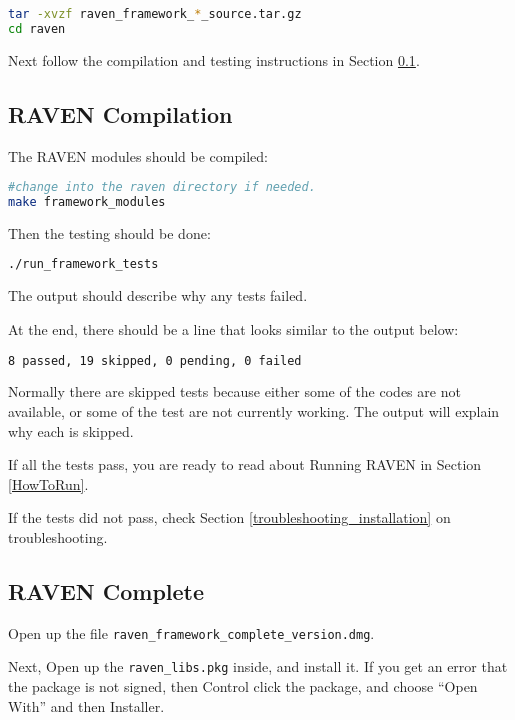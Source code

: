 \begin{lstlisting}[language=bash]
tar -xvzf raven_framework_*_source.tar.gz
cd raven
\end{lstlisting}

Next follow the compilation and testing instructions in Section
\ref{raven_compilation}.

\subsection{RAVEN Compilation}
\label{raven_compilation}

The RAVEN modules should be compiled:

\begin{lstlisting}[language=bash]
#change into the raven directory if needed.
make framework_modules
\end{lstlisting}

Then the testing should be done:

\begin{lstlisting}[language=bash]
./run_framework_tests
\end{lstlisting}

The output should describe why any tests failed.

At the end, there should be a line that looks similar to the output below:
\begin{lstlisting}[language=bash]
8 passed, 19 skipped, 0 pending, 0 failed
\end{lstlisting}

Normally there are skipped tests because either some of the codes are
not available, or some of the test are not currently working.  The
output will explain why each is skipped.

If all the tests pass, you are ready to read about Running RAVEN in
Section \ref{HowToRun}.

If the tests did not pass, check Section
\ref{troubleshooting_installation} on troubleshooting.

\subsection{RAVEN Complete}
\label{raven_complete}

Open up the file \texttt{raven\_framework\_complete\_version.dmg}.

Next, Open up the \texttt{raven\_libs.pkg} inside, and install it.  If
you get an error that the package is not signed, then Control click
the package, and choose ``Open With'' and then Installer.

